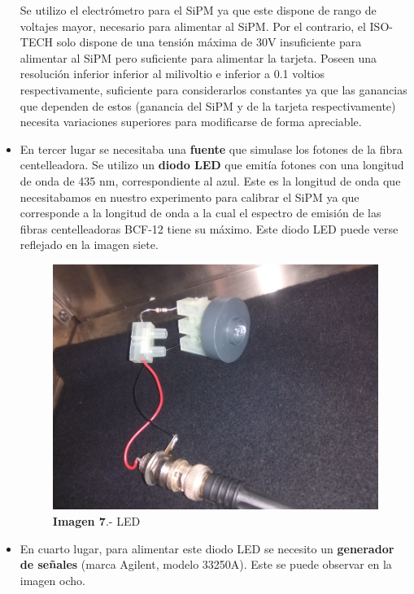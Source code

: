 \begin{itemize}
Se utilizo el electrómetro para el SiPM ya que este dispone de rango de voltajes mayor, necesario para alimentar al SiPM. Por el contrario, el ISO-TECH solo dispone de una tensión máxima de 30V insuficiente para alimentar al SiPM pero suficiente para alimentar la tarjeta. Poseen una resolución inferior inferior al milivoltio e inferior a 0.1 voltios respectivamente, suficiente para considerarlos constantes ya que las ganancias que dependen de estos (ganancia del SiPM y de la tarjeta respectivamente) necesita variaciones superiores para modificarse de forma apreciable.

\item {} En tercer lugar se necesitaba una \textbf{fuente} que simulase los fotones de la fibra centelleadora. 
\newline
Se utilizo un \textbf{diodo LED} que emitía fotones con una longitud de onda de 435 nm, correspondiente al azul. Este es la longitud de onda que necesitabamos en nuestro experimento para calibrar el SiPM ya que corresponde a la longitud de onda a la cual el espectro de emisión de las fibras centelleadoras BCF-12 tiene su máximo. Este diodo LED puede verse reflejado en la imagen siete.

\begin{figure}[hbtp]
\centering
\includegraphics[scale=0.25]{LED.png}
\caption{\textbf{Imagen 7}.- LED}
\end{figure}

\item {} En cuarto lugar, para alimentar este diodo LED se necesito un \textbf{generador de señales} (marca Agilent, modelo 33250A). Este se puede observar en la imagen ocho.


\end{itemize}

